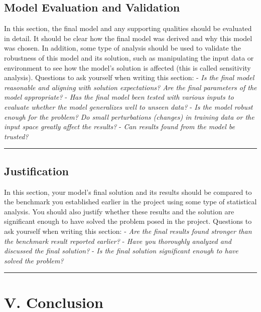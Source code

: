 \documentclass[12pt]{article}
\begin{document}
\begin{enumerate}
\subsection{Model Evaluation and Validation}\label{model-evaluation-and-validation}

In this section, the final model and any supporting qualities should be
evaluated in detail. It should be clear how the final model was derived
and why this model was chosen. In addition, some type of analysis should
be used to validate the robustness of this model and its solution, such
as manipulating the input data or environment to see how the model's
solution is affected (this is called sensitivity analysis). Questions to
ask yourself when writing this section: - \emph{Is the final model
reasonable and aligning with solution expectations? Are the final
parameters of the model appropriate?} - \emph{Has the final model been
tested with various inputs to evaluate whether the model generalizes
well to unseen data?} - \emph{Is the model robust enough for the
problem? Do small perturbations (changes) in training data or the input
space greatly affect the results?} - \emph{Can results found from the
model be trusted?}

\begin{center}\rule{0.5\linewidth}{\linethickness}\end{center}

\subsection{Justification}\label{justification}

In this section, your model's final solution and its results should be
compared to the benchmark you established earlier in the project using
some type of statistical analysis. You should also justify whether these
results and the solution are significant enough to have solved the
problem posed in the project. Questions to ask yourself when writing
this section: - \emph{Are the final results found stronger than the
benchmark result reported earlier?} - \emph{Have you thoroughly analyzed
and discussed the final solution?} - \emph{Is the final solution
significant enough to have solved the problem?}

\begin{center}\rule{0.5\linewidth}{\linethickness}\end{center}

\section{V. Conclusion}\label{v.-conclusion}


\end{enumerate}
\end{document}

